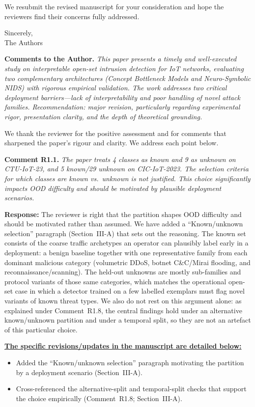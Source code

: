 \documentclass[11pt]{article}
\newcommand{\reviewer}[1]{\bigskip\noindent{\Large\textbf{Reviewer~#1}}\par\medskip}
\newcommand{\cmt}[2]{\medskip\noindent\textbf{Comment #1.} \textit{#2}\par}
\newcommand{\resp}{\smallskip\par\noindent\textbf{Response:} }
\newcommand{\revs}{\smallskip\par\noindent\underline{\textbf{The specific revisions/updates in the manuscript are detailed below:}}\par}
\begin{document}
\smallskip
We resubmit the revised manuscript for your consideration and hope the reviewers
find their concerns fully addressed.

\smallskip
\noindent Sincerely,\\
\noindent The Authors

\reviewer{1}
\noindent\textbf{Comments to the Author.} \textit{This paper presents a timely
and well-executed study on interpretable open-set intrusion detection for IoT
networks, evaluating two complementary architectures (Concept Bottleneck Models
and Neuro-Symbolic NIDS) with rigorous empirical validation. The work addresses
two critical deployment barriers---lack of interpretability and poor handling of
novel attack families. Recommendation: major revision, particularly regarding
experimental rigor, presentation clarity, and the depth of theoretical
grounding.}

\smallskip
We thank the reviewer for the positive assessment and for comments that sharpened
the paper's rigour and clarity. We address each point below.

\cmt{R1.1}{The paper treats 4 classes as known and 9 as unknown on CTU-IoT-23,
and 5 known/29 unknown on CIC-IoT-2023. The selection criteria for which classes
are known vs.\ unknown is not justified. This choice significantly impacts OOD
difficulty and should be motivated by plausible deployment scenarios.}
\resp The reviewer is right that the partition shapes OOD difficulty and should be
motivated rather than assumed. We have added a ``Known/unknown selection''
paragraph (Section~III-A) that sets out the reasoning. The known set consists of
the coarse traffic archetypes an operator can plausibly label early in a
deployment: a benign baseline together with one representative family from each
dominant malicious category (volumetric DDoS, botnet C\&C/Mirai flooding, and
reconnaissance/scanning). The held-out unknowns are mostly sub-families and
protocol variants of those same categories, which matches the operational
open-set case in which a detector trained on a few labelled exemplars must flag
novel variants of known threat types. We also do not rest on this argument alone:
as explained under Comment~R1.8, the central findings hold under an alternative
known/unknown partition and under a temporal split, so they are not an artefact of
this particular choice.
\revs
\begin{itemize}
  \item Added the ``Known/unknown selection'' paragraph motivating the partition
  by a deployment scenario (Section~III-A).
  \item Cross-referenced the alternative-split and temporal-split checks that
  support the choice empirically (Comment~R1.8; Section~III-A).
\end{itemize}
\end{document}
